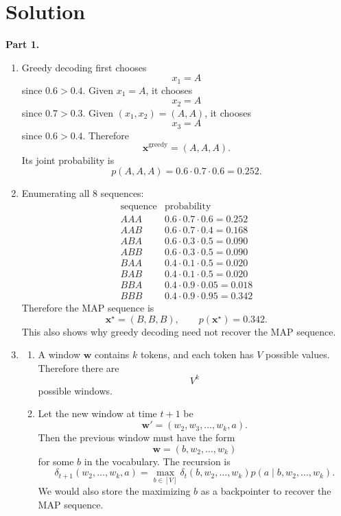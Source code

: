 \documentclass[submit]{harvardml}
\newenvironment{solution}
  {\color{blue}\section*{Solution}}
{}
\begin{document}
\begin{solution}
	\textbf{Part 1.}

\begin{enumerate}
    \item[1a.] Greedy decoding first chooses
    \[
    x_1=A
    \]
    since $0.6>0.4$. Given $x_1=A$, it chooses
    \[
    x_2=A
    \]
    since $0.7>0.3$. Given $(x_1,x_2)=(A,A)$, it chooses
    \[
    x_3=A
    \]
    since $0.6>0.4$. Therefore
    \[
    \mathbf{x}^{\text{greedy}}=(A,A,A).
    \]
    Its joint probability is
    \[
    p(A,A,A)=0.6\cdot 0.7\cdot 0.6=0.252.
    \]

    \item[1b.] Enumerating all 8 sequences:
    \[
    \begin{array}{c|c}
    \text{sequence} & \text{probability} \\
    \hline
    AAA & 0.6\cdot 0.7\cdot 0.6=0.252 \\
    AAB & 0.6\cdot 0.7\cdot 0.4=0.168 \\
    ABA & 0.6\cdot 0.3\cdot 0.5=0.090 \\
    ABB & 0.6\cdot 0.3\cdot 0.5=0.090 \\
    BAA & 0.4\cdot 0.1\cdot 0.5=0.020 \\
    BAB & 0.4\cdot 0.1\cdot 0.5=0.020 \\
    BBA & 0.4\cdot 0.9\cdot 0.05=0.018 \\
    BBB & 0.4\cdot 0.9\cdot 0.95=0.342
    \end{array}
    \]
    Therefore the MAP sequence is
    \[
    \mathbf{x}^\star=(B,B,B), \qquad p(\mathbf{x}^\star)=0.342.
    \]
    This also shows why greedy decoding need not recover the MAP sequence.

    \item[1c.]
    \begin{enumerate}
        \item[(i)] A window $\mathbf{w}$ contains $k$ tokens, and each token has $V$ possible values. Therefore there are
        \[
        V^k
        \]
        possible windows.

        \item[(ii)] Let the new window at time $t+1$ be
        \[
        \mathbf{w}'=(w_2,w_3,\ldots,w_k,a).
        \]
        Then the previous window must have the form
        \[
        \mathbf{w}=(b,w_2,\ldots,w_k)
        \]
        for some $b$ in the vocabulary. The recursion is
        \[
        \delta_{t+1}(w_2,\ldots,w_k,a)
        =\max_{b\in[V]}
        \delta_t(b,w_2,\ldots,w_k)
        p(a\mid b,w_2,\ldots,w_k).
        \]
        We would also store the maximizing $b$ as a backpointer to recover the MAP sequence.


\end{enumerate}
\end{enumerate}
\end{solution}
\end{document}

